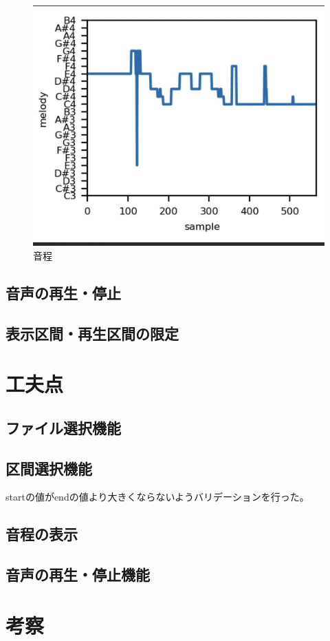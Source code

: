 \documentclass[a4paper,11pt]{jsarticle}
\begin{document}
\begin{figure}[h]
\centering
\includegraphics[keepaspectratio, width=13cm]
{./images/melody.jpg}
\caption{音程}
\label{fig:pitch}
\end{figure}

\subsection{音声の再生・停止}

\subsection{表示区間・再生区間の限定}

\section{工夫点}
\subsection{ファイル選択機能}

\subsection{区間選択機能}
startの値がendの値より大きくならないようバリデーションを行った。

\subsection{音程の表示}

\subsection{音声の再生・停止機能}


\section{考察}

\end{document}

